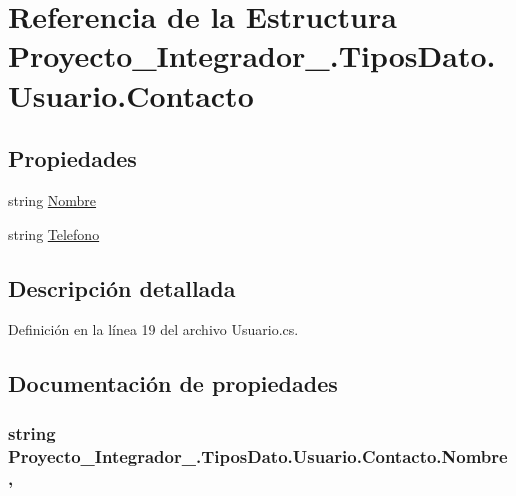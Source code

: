 \hypertarget{struct_proyecto___integrador__3_1_1_tipos_dato_1_1_usuario_1_1_contacto}{\section{Referencia de la Estructura Proyecto\-\_\-\-Integrador\-\_.\-Tipos\-Dato.\-Usuario.\-Contacto}
\label{struct_proyecto___integrador__3_1_1_tipos_dato_1_1_usuario_1_1_contacto}
}
\subsection*{Propiedades}
\begin{DoxyCompactItemize}
\item 
string \hyperlink{struct_proyecto___integrador__3_1_1_tipos_dato_1_1_usuario_1_1_contacto_a3e93d9ea0c8ee3ff1636026f11aa70f2}{Nombre}
\item 
string \hyperlink{struct_proyecto___integrador__3_1_1_tipos_dato_1_1_usuario_1_1_contacto_ab7f1bc9965c69b9f9c44f5f021fdaec9}{Telefono}
\end{DoxyCompactItemize}


\subsection{Descripción detallada}


Definición en la línea 19 del archivo Usuario.\-cs.



\subsection{Documentación de propiedades}
\hypertarget{struct_proyecto___integrador__3_1_1_tipos_dato_1_1_usuario_1_1_contacto_a3e93d9ea0c8ee3ff1636026f11aa70f2}{
\subsubsection[{Nombre}]{\setlength{\rightskip}{0pt plus 5cm}string Proyecto\-\_\-\-Integrador\-\_.\-Tipos\-Dato.\-Usuario.\-Contacto.\-Nombre\hspace{0.3cm}{\ttfamily [get]}, {\ttfamily [set]}}}\label{struct_proyecto___integrador__3_1_1_tipos_dato_1_1_usuario_1_1_contacto_a3e93d9ea0c8ee3ff1636026f11aa70f2}


